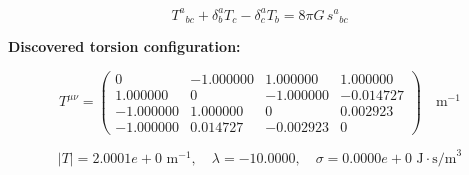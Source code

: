 
\begin{equation}
  T^a{}_{bc} + \delta^a_b T_c - \delta^a_c T_b = 8\pi G \, s^a{}_{bc}
\end{equation}

\textbf{Discovered torsion configuration:}

\begin{equation}
  T^{\mu\nu} = \begin{pmatrix}
    0 & -1.000000 & 1.000000 & 1.000000 \\
    1.000000 & 0 & -1.000000 & -0.014727 \\
    -1.000000 & 1.000000 & 0 & 0.002923 \\
    -1.000000 & 0.014727 & -0.002923 & 0
  \end{pmatrix} \quad \text{m}^{-1}
\end{equation}

\begin{equation}
  |T| = 2.0001e+0 \text{ m}^{-1}, \quad
  \lambda = -10.0000, \quad
  \sigma = 0.0000e+0 \text{ J}\cdot\text{s/m}^3
\end{equation}